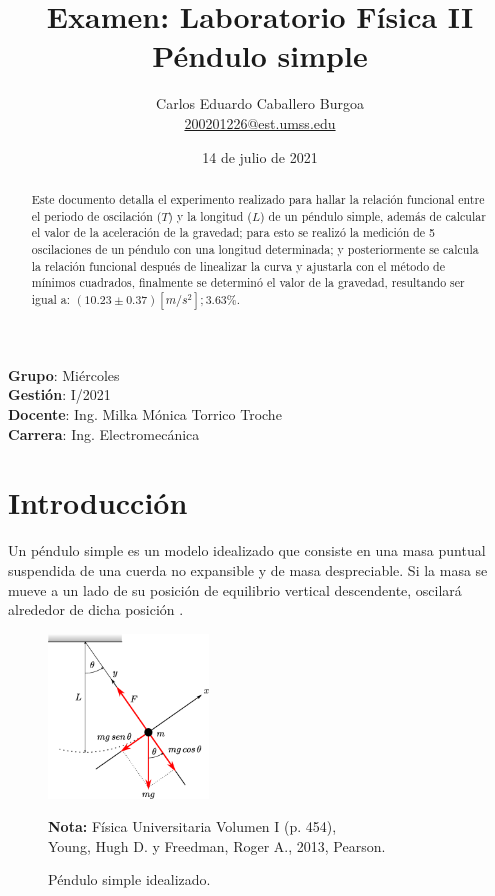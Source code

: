 \documentclass[letter,11pt]{article}
\title{Examen: Laboratorio Física II \\Péndulo simple}
\author{Carlos Eduardo Caballero Burgoa \\
    \small{\href{mailto:200201226@est.umss.edu}{200201226@est.umss.edu}}
}
\date{14 de julio de 2021}
\newcommand{\source}[1]{\vspace{-11pt} \caption*{\small{\textbf{Nota:} {#1}}}}
\begin{document}
\maketitle
\begin{center}
    \textbf{Grupo}: Miércoles\\
    \textbf{Gestión}: I/2021\\
    \textbf{Docente}: Ing. Milka Mónica Torrico Troche\\
    \textbf{Carrera}: Ing. Electromecánica
\end{center}

\begin{abstract}
Este documento detalla el experimento realizado para hallar la
relación funcional entre el periodo de oscilación ($T$) y la longitud ($L$) de
un péndulo simple, además de calcular el valor de la aceleración de la gravedad;
para esto se realizó la medición de 5 oscilaciones de un péndulo con una
longitud determinada; y posteriormente se calcula la relación funcional después
de linealizar la curva y ajustarla con el método de mínimos cuadrados,
finalmente se determinó el valor de la gravedad, resultando ser igual a:
$(10.23 \pm 0.37)[m/s^2]; 3.63\%$.
\end{abstract}

\section{Introducción}

Un péndulo simple es un modelo idealizado que consiste en una masa puntual
suspendida de una cuerda no expansible y de masa despreciable. Si la masa se
mueve a un lado de su posición de equilibrio vertical descendente, oscilará
alrededor de dicha posición \cite{Young&Freedman}.

\begin{figure}
\centering
\includegraphics[width=0.38\textwidth]{resources/f1.eps}
\caption{Péndulo simple idealizado.}
\label{figura1}
\source{Física Universitaria Volumen I (p. 454), \\
Young, Hugh D. y Freedman, Roger A., 2013, Pearson.}
\end{figure}
\end{document}
